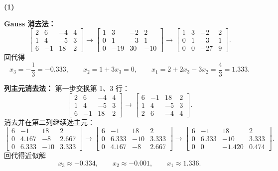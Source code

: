 \documentclass[11pt, a4paper]{ctexart}
\begin{document}
\begin{solution}
    \textbf{(1)}

    \textbf{Gauss 消去法：}
    \[
        \left[
        \begin{array}{ccc|c}
            2 & 6 & -4 & 4 \\
            1 & 4 & -5 & 3 \\
            6 & -1 & 18 & 2
        \end{array}
        \right]
        \to
        \left[
        \begin{array}{ccc|c}
            1 & 3 & -2 & 2 \\
            0 & 1 & -3 & 1 \\
            0 & -19 & 30 & -10
        \end{array}
        \right]
        \to
        \left[
        \begin{array}{ccc|c}
            1 & 3 & -2 & 2 \\
            0 & 1 & -3 & 1 \\
            0 & 0 & -27 & 9
        \end{array}
        \right].
    \]
    回代得
    \[
        x_3 = -\frac{1}{3} = -0.333,\qquad
        x_2 = 1 + 3x_3 = 0,\qquad
        x_1 = 2 + 2x_3 - 3x_2 = \frac{4}{3} = 1.333.
    \]

    \textbf{列主元消去法：}
    第一步交换第 1、3 行：
    \[
        \left[
        \begin{array}{ccc|c}
            2 & 6 & -4 & 4 \\
            1 & 4 & -5 & 3 \\
            6 & -1 & 18 & 2
        \end{array}
        \right]
        \to
        \left[
        \begin{array}{ccc|c}
            6 & -1 & 18 & 2 \\
            1 & 4 & -5 & 3 \\
            2 & 6 & -4 & 4
        \end{array}
        \right].
    \]
    消去并在第二列继续选主元：
    \[
        \left[
        \begin{array}{ccc|c}
            6 & -1 & 18 & 2 \\
            0 & 4.167 & -8 & 2.667 \\
            0 & 6.333 & -10 & 3.333
        \end{array}
        \right]
        \to
        \left[
        \begin{array}{ccc|c}
            6 & -1 & 18 & 2 \\
            0 & 6.333 & -10 & 3.333 \\
            0 & 4.167 & -8 & 2.667
        \end{array}
        \right]
        \to
        \left[
        \begin{array}{ccc|c}
            6 & -1 & 18 & 2 \\
            0 & 6.333 & -10 & 3.333 \\
            0 & 0 & -1.420 & 0.474
        \end{array}
        \right].
    \]
    回代得近似解
    \[
        x_3 \approx -0.334,\qquad
        x_2 \approx -0.001,\qquad
        x_1 \approx 1.336.
    \]


\end{solution}
\end{document}
